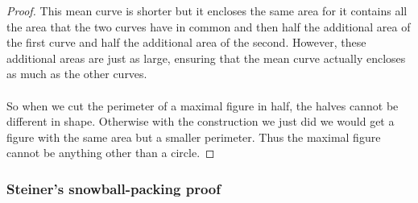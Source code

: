 \documentclass[12pt, a4paper, titlepage]{article}
\begin{document}
\begin{proof}
This mean curve is shorter but it encloses the same area for it contains all the area that the two curves have in common and then half the additional area of the first curve and half the additional area of the second. However, these additional areas are just as large, ensuring that the mean curve actually encloses as much as the other curves.\\\\
So when we cut the perimeter of a maximal figure in half, the halves cannot be different in shape. Otherwise with the construction we just did we would get a figure with the same area but a smaller perimeter. Thus the maximal figure cannot be anything other than a circle.
\end{proof}
\newpage
\subsubsection*{Steiner's snowball-packing proof}
\end{document}
